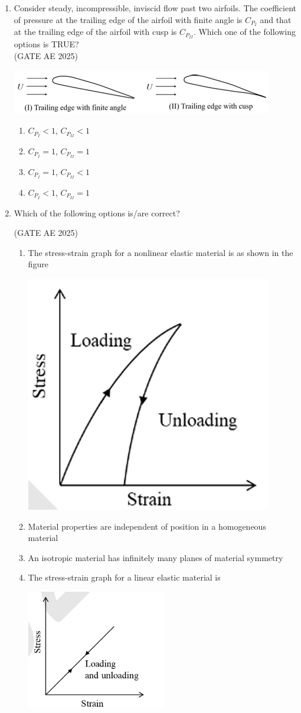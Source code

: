 \documentclass[journal,12pt,onecolumn]{IEEEtran}
\theoremstyle{remark}
\begin{document}
\begin{flushleft}
\begin{enumerate}
\item Consider steady, incompressible, inviscid flow past two airfoils. The coefficient of pressure at the trailing edge of the airfoil with finite angle is $C_{P_I}$ and that at the trailing edge of the airfoil with cusp is $C_{P_{II}}$. Which one of the following options is TRUE?\\ \hfill (GATE AE 2025)\\
\begin{center}
\includegraphics[width=0.5\columnwidth]{figs/angle.png}
\caption{}
    \label{fig:placeholder}
\end{center}
\begin{enumerate}
    \item $C_{P_I} < 1$, $C_{P_{II}} < 1$
    \item $C_{P_I} = 1$, $C_{P_{II}} = 1$
    \item $C_{P_I} = 1$, $C_{P_{II}} < 1$
    \item $C_{P_I} < 1$, $C_{P_{II}} = 1$
\end{enumerate}

\item  Which of the following options is/are correct?

\hfill (GATE AE 2025)

\begin{enumerate}
    \item The stress-strain graph for a nonlinear elastic material is as shown in the figure 
    
    \hfill{\includegraphics[width=0.25\columnwidth]{figs/1.png}}
    
    \item Material properties are independent of position in a homogeneous material
    \item An isotropic material has infinitely many planes of material symmetry
    \item The stress-strain graph for a linear elastic material is
    
    \hfill{\includegraphics[width=0.25\columnwidth]{figs/2.png}}
    

\end{enumerate}
\end{enumerate}
\end{flushleft}
\end{document}
